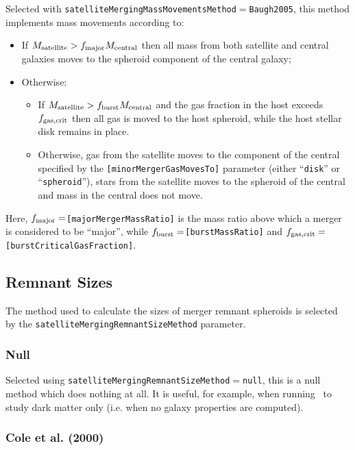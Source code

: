Selected with {\tt satelliteMergingMassMovementsMethod}$=${\tt Baugh2005}, this method implements mass movements according to:
\begin{itemize}
 \item If $M_{\rm satellite} > f_{\rm major} M_{\rm central}$ then all mass from both satellite and central galaxies moves to the spheroid component of the central galaxy;
 \item Otherwise:
 \begin{itemize}
  \item If $M_{\rm satellite} > f_{\rm burst} M_{\rm central}$ and the gas fraction in the host exceeds $f_{\rm gas,crit}$ then all gas is moved to the host spheroid, while the host stellar disk remains in place.
  \item Otherwise, gas from the satellite moves to the component of the central specified by the {\tt [minorMergerGasMovesTo]} parameter (either ``{\tt disk}'' or ``{\tt spheroid}''), stars from the satellite moves to the spheroid of the central and mass in the central does not move.
 \end{itemize}
\end{itemize}
Here, $f_{\rm major}=${\tt [majorMergerMassRatio]} is the mass ratio above which a merger is considered to be ``major'', while $f_{\rm burst}=${\tt [burstMassRatio]} and $f_{\rm gas,crit}=${\tt [burstCriticalGasFraction]}.

\subsection{Remnant Sizes}

The method used to calculate the sizes of merger remnant spheroids is selected by the {\tt satelliteMergingRemnantSizeMethod} parameter.

\subsubsection{Null}

Selected using {\tt satelliteMergingRemnantSizeMethod}$=${\tt null}, this is a null method which does nothing at all. It is useful, for example, when running \glc\ to study dark matter only (i.e. when no galaxy properties are computed).

\subsubsection{Cole et al. (2000)}\label{sec:MergerRemnantSizeCole2000}

